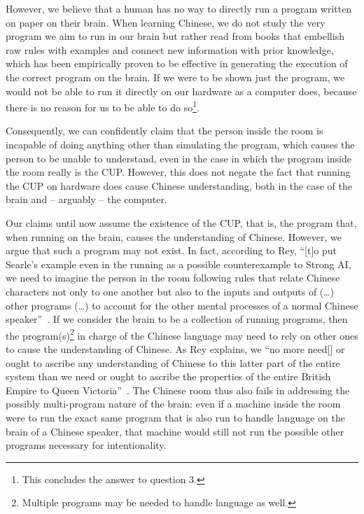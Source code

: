 However, we believe that a human has no way to directly run a program written on paper on their brain. When learning Chinese, we do not study the very program we aim to run in our brain but rather read from books that embellish raw rules with examples and connect new information with prior knowledge, which has been empirically proven to be effective in generating the execution of the correct program on the brain. If we were to be shown just the program, we would not be able to run it directly on our hardware as a computer does, because there is no reason for us to be able to do so\footnote{This concludes the answer to question 3.}.

Consequently, we can confidently claim that the person inside the room is incapable of doing anything other than simulating the program, which causes the person to be unable to understand, even in the case in which the program inside the room really is the CUP. However, this does not negate the fact that running the CUP on hardware does cause Chinese understanding, both in the case of the brain and – arguably – the computer.

Our claims until now assume the existence of the CUP, that is, the program that, when running on the brain, causes the understanding of Chinese. However, we argue that such a program may not exist. In fact, according to Rey, ``[t]o put Searle's example even in the running as a possible counterexample to Strong AI, we need to imagine the person in the room following rules that relate Chinese characters not only to one another but also to the inputs and outputs of (\ldots) other programs (\ldots) to account for the other mental processes of a normal Chinese speaker''~\cite[pp.~3-4]{rey1986s}.
If we consider the brain to be a collection of running programs, then the program(s)\footnote{Multiple programs may be needed to handle language as well.} in charge of the Chinese language may need to rely on other ones to cause the understanding of Chinese. As Rey explains, we ``no more need[] or ought to ascribe any understanding of Chinese to this latter part of the entire system than we need or ought to ascribe the properties of the entire British Empire to Queen Victoria''~\cite[p.6]{rey1986s}. The Chinese room thus also fails in addressing the possibly multi-program nature of the brain: even if a machine inside the room were to run the exact same program that is also run to handle language on the brain of a Chinese speaker, that machine would still not run the possible other programs necessary for intentionality.
